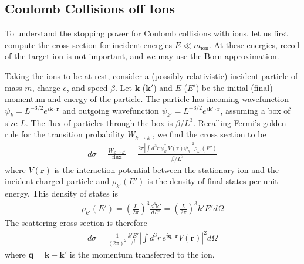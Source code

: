 \documentclass[preprintnumbers,amsmath,amssymb,prd, superscriptaddress,twocolumn]{revtex4}
\begin{document}
\begin{appendices}


\subsection{Coulomb Collisions off Ions}
To understand the stopping power for Coulomb collisions with ions, let us first compute the cross section for incident energies $E \ll m_\text{ion}$.
At these energies, recoil of the target ion is not important, and we may use the Born approximation.

Taking the ions to be at rest, consider a (possibly relativistic) incident particle of mass $m$, charge $e$, and speed $\beta$. Let $\textbf{k}$ ($\textbf{k}'$) and $E$ ($E'$) be the initial (final) momentum and energy of the particle.
The particle has incoming wavefunction $\psi_k = L^{-3/2}e^{i \textbf{k}\cdot \textbf{r}}$ and outgoing wavefunction $\psi_{k'} = L^{-3/2}e^{i \textbf{k}'\cdot \textbf{r}}$, assuming a box of size $L$.
The flux of particles through the box is $\beta/L^3$.
Recalling Fermi's golden rule for the transition probability $W_{k\to k'}$, we find the cross section to be
\begin{align}
  \label{eq:DifferentialBornCrossSection}
d\sigma = \frac{W_{k\to k'}}{\text{flux}} = \frac{2 \pi|\int d^3r \, \psi_{k'}^* V(\textbf{r})\psi_k|^2 \rho_{k'}(E')}{\beta/L^3}
\end{align}
where $V(\textbf{r})$ is the interaction potential between the stationary ion and the incident charged particle and $\rho_{k'}(E')$ is the density of final states per unit energy.
This density of states is
\begin{align}
\rho_{k'}(E') = \left( \frac{L}{2 \pi} \right)^3 \frac{d^3 \textbf{k}'}{dE'}
  = \left( \frac{L}{2 \pi} \right)^3 k' E' d \Omega
\end{align}
The scattering cross section is therefore
\begin{align}
d\sigma = \frac{1}{(2 \pi)^2} \frac{k'E'}{\beta} \left|\int d^3r \, e^{i\textbf{q}\cdot \textbf{r}}V(\textbf{r})\right|^2 d \Omega
\end{align}
where $\textbf{q} = \textbf{k} - \textbf{k}'$ is the momentum transferred to the ion.


\end{appendices}
\end{document}
